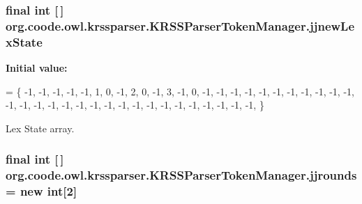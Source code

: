 \hypertarget{classorg_1_1coode_1_1owl_1_1krssparser_1_1_k_r_s_s_parser_token_manager_a35542c9ac198e71f1aba9e2428491436}{
\subsubsection[{jjnew\-Lex\-State}]{\setlength{\rightskip}{0pt plus 5cm}final int \mbox{[}$\,$\mbox{]} org.\-coode.\-owl.\-krssparser.\-K\-R\-S\-S\-Parser\-Token\-Manager.\-jjnew\-Lex\-State\hspace{0.3cm}{\ttfamily [static]}}}\label{classorg_1_1coode_1_1owl_1_1krssparser_1_1_k_r_s_s_parser_token_manager_a35542c9ac198e71f1aba9e2428491436}
{\bfseries Initial value\-:}
\begin{DoxyCode}
= \{
        -1, -1, -1, -1, -1, 1, 0, -1, 2, 0, -1, 3, -1, 0, -1, -1, -1, -1, -1, -1, -1, -1, -1, -1, -1,
        -1, -1, -1, -1, -1, -1, -1, -1, -1, -1, -1, -1, -1, -1, -1, -1, -1, -1,
    \}
\end{DoxyCode}
Lex State array. \hypertarget{classorg_1_1coode_1_1owl_1_1krssparser_1_1_k_r_s_s_parser_token_manager_a948c4e47aeddc768faba0733d39b4f03}{
\subsubsection[{jjrounds}]{\setlength{\rightskip}{0pt plus 5cm}final int \mbox{[}$\,$\mbox{]} org.\-coode.\-owl.\-krssparser.\-K\-R\-S\-S\-Parser\-Token\-Manager.\-jjrounds = new int\mbox{[}2\mbox{]}\hspace{0.3cm}{\ttfamily [private]}}}\label{classorg_1_1coode_1_1owl_1_1krssparser_1_1_k_r_s_s_parser_token_manager_a948c4e47aeddc768faba0733d39b4f03}
